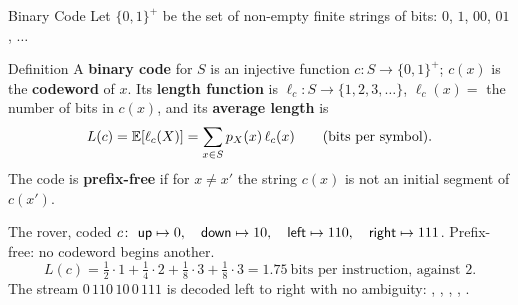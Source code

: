 \begin{frame}{Binary Code}
  \small
  Let $\{0,1\}^+$ be the set of non-empty finite strings of bits: $0$, $1$, $00$, $01$, $\dots$
  \begin{block}{Definition}
    A \textbf{binary code} for $S$ is an injective function $c\colon S\to\{0,1\}^+$; $c(x)$ is the \textbf{codeword} of $x$.
    Its \textbf{length function} is $\ell_c\colon S\to\{1,2,3,\dots\}$, $\ell_c(x)=$ the number of bits in $c(x)$, and its \textbf{average length} is
    \[
      L(c)=\mathbb{E}[\ell_c(X)]=\sum_{x\in S}p_X(x)\,\ell_c(x)\qquad\text{(bits per symbol).}
    \]
    The code is \textbf{prefix-free} if for $x\neq x'$ the string $c(x)$ is not an initial segment of $c(x')$.
  \end{block}
  \begin{exampleblock}{The rover, coded}
    $c\colon\ \up\mapsto0,\quad\down\mapsto10,\quad\lft\mapsto110,\quad\rgt\mapsto111$. Prefix-free: no codeword begins another.
    \[
      L(c)=\tfrac12\cdot1+\tfrac14\cdot2+\tfrac18\cdot3+\tfrac18\cdot3=1.75\ \text{bits per instruction, against } 2 .
    \]
    The stream $0\,110\,10\,0\,111$ is decoded left to right with no ambiguity: \up, \lft, \down, \up, \rgt.
  \end{exampleblock}
\end{frame}

